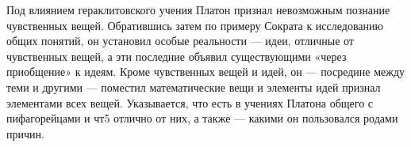 \documentclass{article}
\begin{document}
Под влиянием гераклитовского учения Платон признал невозможным познание чувственных вещей. Обратившись затем по примеру Сократа к исследованию общих понятий, он установил особые реальности --- идеи, отличные от чувственных вещей, а эти последние объявил существующими «через приобщение» к идеям. Кроме чувственных вещей и идей, он --- посредине между теми и другими --- поместил математические вещи и элементы идей признал элементами всех вещей. Указывается, что есть в учениях Платона общего с пифагорейцами и чт5 отлично от них, а также --- какими он пользовался родами причин.
\end{document}
